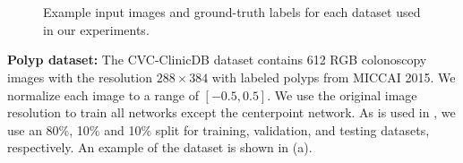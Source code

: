 	\begin{figure}
	\hfill
	 \\
	\hfill
	 \\
	\caption{Example input images and ground-truth labels for each dataset used in our experiments. \cite{bencevicTrainingPolarImage2021}}
	\label{fig:datasets}
	\end{figure}

\textbf{Polyp dataset:} The CVC-ClinicDB dataset
\cite{bernalWMDOVAMapsAccurate2015} contains 612 RGB 
colonoscopy images with the resolution $288 \times 384$ 
with labeled polyps from MICCAI 2015. We normalize each image to a range of $[-0.5, 0.5]$. 
We use the original image resolution to train all networks except the 
centerpoint network. As is used in \cite{jhaDoubleUNetDeepConvolutional2020}, 
we use an 80\%, 10\% and 10\% 
split for training, validation, and testing datasets, respectively. An example of the dataset is shown in (a).

